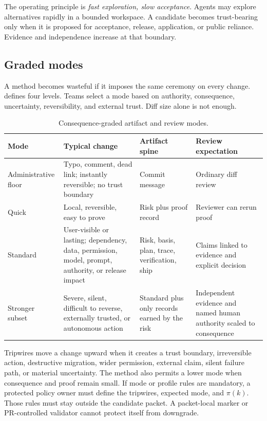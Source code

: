 \documentclass[11pt]{article}
\begin{document}
The operating principle is \emph{fast exploration, slow acceptance}. Agents may explore alternatives rapidly in a bounded workspace. A candidate becomes trust-bearing only when it is proposed for acceptance, release, application, or public reliance. Evidence and independence increase at that boundary.

\subsection{Graded modes}

A method becomes wasteful if it imposes the same ceremony on every change.  defines four levels. Teams select a mode based on authority, consequence, uncertainty, reversibility, and external trust. Diff size alone is not enough.

\begin{table}[t]
\centering
\caption{Consequence-graded artifact and review modes.}
\label{tab:modes}
\small
\begin{tabularx}{\textwidth}{>{\raggedright\arraybackslash}p{} >{\raggedright\arraybackslash}p{} >{\raggedright\arraybackslash}p{} X}
\toprule
Mode & Typical change & Artifact spine & Review expectation \\
\midrule
Administrative floor & Typo, comment, dead link; instantly reversible; no trust boundary & Commit message & Ordinary diff review \\
Quick & Local, reversible, easy to prove & Risk plus proof record & Reviewer can rerun proof \\
Standard & User-visible or lasting; dependency, data, permission, model, prompt, authority, or release impact & Risk, basis, plan, trace, verification, ship & Claims linked to evidence and explicit decision \\
Stronger subset & Severe, silent, difficult to reverse, externally trusted, or autonomous action & Standard plus only records earned by the risk & Independent evidence and named human authority scaled to consequence \\
\bottomrule
\end{tabularx}
\end{table}

Tripwires move a change upward when it creates a trust boundary, irreversible action, destructive migration, wider permission, external claim, silent failure path, or material uncertainty. The method also permits a lower mode when consequence and proof remain small. If mode or profile rules are mandatory, a protected policy owner must define the tripwires, expected mode, and $\pi(k)$. Those rules must stay outside the candidate packet. A packet-local marker or PR-controlled validator cannot protect itself from downgrade.
\end{document}
